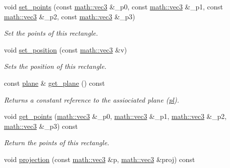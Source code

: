 \begin{DoxyCompactItemize}
void \hyperlink{classphysim_1_1geometric_1_1rectangle_a55107f7bfff66f8f46392eb5a7a68aae}{set\+\_\+points} (const \hyperlink{structphysim_1_1math_1_1vec3}{math\+::vec3} \&\+\_\+p0, const \hyperlink{structphysim_1_1math_1_1vec3}{math\+::vec3} \&\+\_\+p1, const \hyperlink{structphysim_1_1math_1_1vec3}{math\+::vec3} \&\+\_\+p2, const \hyperlink{structphysim_1_1math_1_1vec3}{math\+::vec3} \&\+\_\+p3)
\begin{DoxyCompactList}\small\item\em Set the points of this rectangle. \end{DoxyCompactList}\item 
void \hyperlink{classphysim_1_1geometric_1_1rectangle_a7458e8b880ace6a3393a728edb6d66fa}{set\+\_\+position} (const \hyperlink{structphysim_1_1math_1_1vec3}{math\+::vec3} \&v)
\begin{DoxyCompactList}\small\item\em Sets the position of this rectangle. \end{DoxyCompactList}\item 
\mbox{\label{classphysim_1_1geometric_1_1rectangle_a74d67c86fce1512928a8ce3712c8dc91}} 
const \hyperlink{classphysim_1_1geometric_1_1plane}{plane} \& \hyperlink{classphysim_1_1geometric_1_1rectangle_a74d67c86fce1512928a8ce3712c8dc91}{get\+\_\+plane} () const
\begin{DoxyCompactList}\small\item\em Returns a constant reference to the assiociated plane (\hyperlink{classphysim_1_1geometric_1_1rectangle_af9c8331b7c76cf77289e08af9b97531e}{pl}). \end{DoxyCompactList}\item 
void \hyperlink{classphysim_1_1geometric_1_1rectangle_a0d5e49e945a8c1a822f7c6c223ce657b}{get\+\_\+points} (\hyperlink{structphysim_1_1math_1_1vec3}{math\+::vec3} \&\+\_\+p0, \hyperlink{structphysim_1_1math_1_1vec3}{math\+::vec3} \&\+\_\+p1, \hyperlink{structphysim_1_1math_1_1vec3}{math\+::vec3} \&\+\_\+p2, \hyperlink{structphysim_1_1math_1_1vec3}{math\+::vec3} \&\+\_\+p3) const
\begin{DoxyCompactList}\small\item\em Return the points of this rectangle. \end{DoxyCompactList}\item 
void \hyperlink{classphysim_1_1geometric_1_1rectangle_a27ae9df28df346dedfbc3500b79123cb}{projection} (const \hyperlink{structphysim_1_1math_1_1vec3}{math\+::vec3} \&p, \hyperlink{structphysim_1_1math_1_1vec3}{math\+::vec3} \&proj) const

\end{DoxyCompactItemize}
